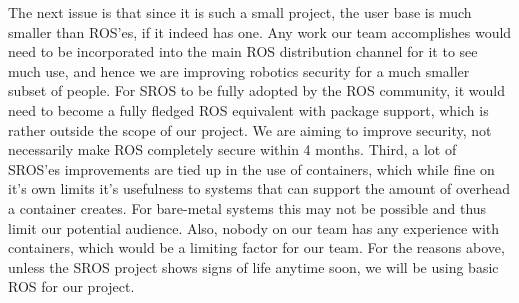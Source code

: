 \documentclass[IEEEtran,letterpaper,10pt,titlepage,draftclsnofoot,onecolumn]{article}
\begin{document}
The next issue is that since it is such a small project, the user base is much smaller than ROS'es, if it indeed has one. 
Any work our team accomplishes would need to be incorporated into the main ROS distribution channel for it to see much use, and hence we are improving robotics security for a much smaller subset of people. 
For SROS to be fully adopted by the ROS community, it would need to become a fully fledged ROS equivalent with package support, which is rather outside the scope of our project. 
We are aiming to improve security, not necessarily make ROS completely secure within 4 months. 
Third, a lot of SROS'es improvements are tied up in the use of containers, which while fine on it's own limits it's usefulness to systems that can support the amount of overhead a container creates. 
For bare-metal systems this may not be possible and thus limit our potential audience. 
Also, nobody on our team has any experience with containers, which would be a limiting factor for our team. 
For the reasons above, unless the SROS project shows signs of life anytime soon, we will be using basic ROS for our project.
\end{document}
